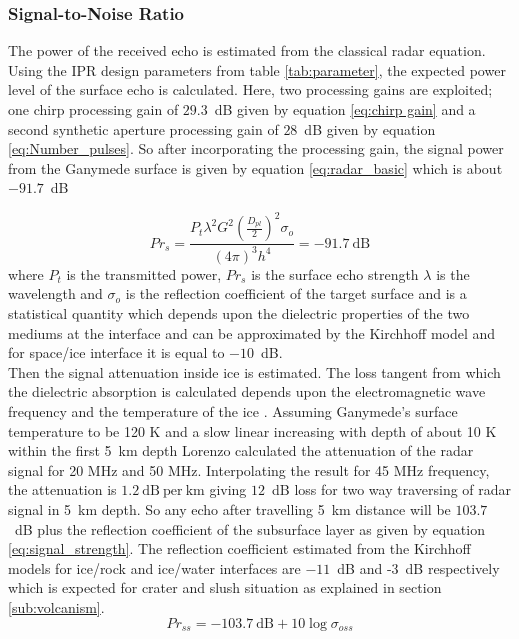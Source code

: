 \subsubsection{Signal-to-Noise Ratio}

The power of the received echo is estimated from the classical radar equation. Using the \ac{IPR} design parameters from table \ref{tab:parameter}, the expected power level of the surface echo is calculated. Here, two processing gains are exploited; one chirp processing gain of $29.3$~dB given by equation \ref{eq:chirp gain} and a second synthetic aperture processing gain of $28$~dB given by equation \ref{eq:Number_pulses}. So after incorporating the processing gain, the signal power from the Ganymede surface is given by equation \ref{eq:radar_basic} which is about $-91.7$~dB

\begin{equation}
Pr_{s} = \dfrac{P_{t}\lambda^{2}G^{2}(\frac{D_{pl}}{2})^{2}\sigma_{o}}{(4\pi)^{3}h^{4}} 
	  = -91.7 \mathrm{~dB} 
\label{eq:radar_basic}
\end{equation}
where $P_{t}$ is the transmitted power, $Pr_{s}$ is the surface echo strength $\lambda$ is the wavelength  and $\sigma_{o}$ is the reflection coefficient of the target surface and is a statistical quantity which depends upon the dielectric properties of the two mediums at the interface and can be approximated by the Kirchhoff model \cite{MIMOSA} and for space/ice interface it is equal to $-10$~dB.\\
%
Then the signal attenuation inside ice is estimated. The loss tangent from which the dielectric absorption is calculated depends upon the electromagnetic wave frequency and the temperature of the ice \cite{MIMOSA}. Assuming Ganymede's surface temperature to be 120 K and a slow linear increasing with depth of about 10 K within the first 5~km depth Lorenzo\cite{Gany_SRS} calculated the attenuation of the radar signal for 20 MHz and 50 MHz. Interpolating the result for 45 MHz frequency, the attenuation is $1.2 \mathrm{~dB~per~km}$ giving $12$~dB loss for two way traversing of radar signal in 5~km depth. So any echo after travelling 5~km distance will be $103.7$~dB plus the reflection coefficient of the subsurface layer as given by equation \ref{eq:signal_strength}. The reflection coefficient estimated from the Kirchhoff models for ice/rock and ice/water interfaces are $-11$~dB and -3~dB respectively which is expected for  crater and slush situation as explained in section \ref{sub:volcanism}.
%
\begin{equation}
Pr_{ss} = -103.7 \mathrm{~dB} + 10 \log \sigma_{oss}
\label{eq:signal_strength}
\end{equation}
